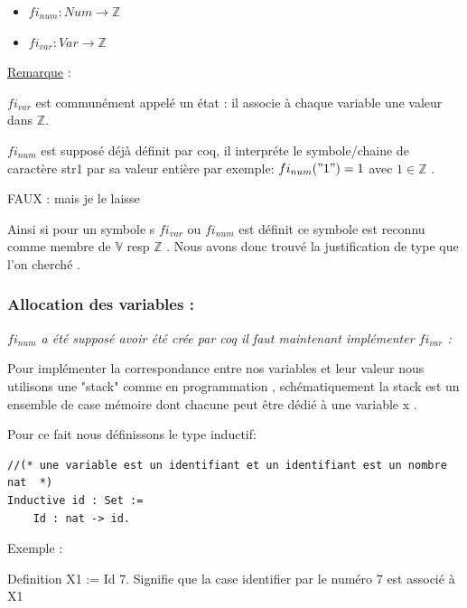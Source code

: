 \documentclass{article}
\begin{document}
\begin{itemize}
\item $fi_{num} : Num \rightarrow \mathbb{Z} $

\item $fi_{var} : Var \rightarrow \mathbb{Z} $

\end{itemize}

\underline{Remarque} :

\medskip

\noindent $fi_{var}$ est communément appelé un état : il associe à chaque variable une valeur dans $\mathbb{Z}$.

\noindent $fi_{num}$ est supposé déjà définit par coq, il interpréte le symbole/chaine de caractère str1 par sa valeur entière par exemple:  $fi_{num}("1") = 1$ avec $1 \in \mathbb{Z} $   . 

FAUX : mais je le laisse 
\medskip

\noindent Ainsi si pour un symbole s $fi_{var}$ ou $fi_{num}$ est définit ce symbole est reconnu comme membre de   $\mathbb{V}$ resp $\mathbb{Z}$ . Nous avons donc trouvé la justification de type que l'on cherché .



\subsubsection{ Allocation des variables  :}


\it{$fi_{num}$ a été supposé avoir été crée par coq il faut maintenant implémenter $fi_{var}$ :}



\noindent Pour implémenter la correspondance entre nos variables et leur valeur nous utilisons une "stack" comme en programmation , schématiquement la stack est un ensemble de case mémoire dont chacune peut être dédié à une variable x .

\medskip

\noindent Pour ce fait nous définissons le type inductif:

\begin{lstlisting}[style=CStyle]
//(* une variable est un identifiant et un identifiant est un nombre nat  *)
Inductive id : Set :=
    Id : nat -> id.

\end{lstlisting}

\noindent Exemple :

Definition X1 := Id 7.
Signifie que la case identifier par le numéro 7 est associé à X1 
\end{document}
